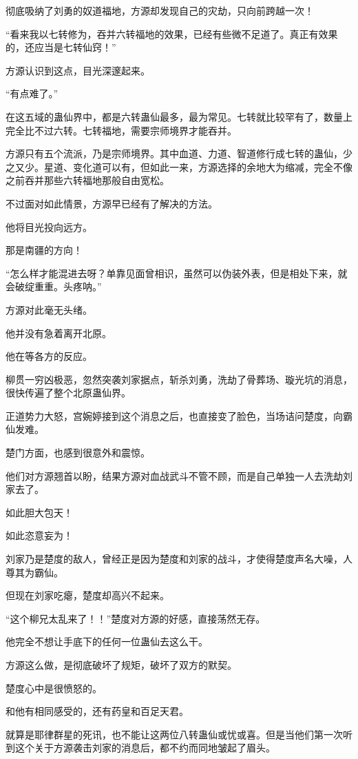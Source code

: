 \begin{this_body}
彻底吸纳了刘勇的奴道福地，方源却发现自己的灾劫，只向前跨越一次！

“看来我以七转修为，吞并六转福地的效果，已经有些微不足道了。真正有效果的，还应当是七转仙窍！”

方源认识到这点，目光深邃起来。

“有点难了。”

在这五域的蛊仙界中，都是六转蛊仙最多，最为常见。七转就比较罕有了，数量上完全比不过六转。七转福地，需要宗师境界才能吞并。

方源只有五个流派，乃是宗师境界。其中血道、力道、智道修行成七转的蛊仙，少之又少。星道、变化道可以有，但如此一来，方源选择的余地大为缩减，完全不像之前吞并那些六转福地那般自由宽松。

不过面对如此情景，方源早已经有了解决的方法。

他将目光投向远方。

那是南疆的方向！

“怎么样才能混进去呀？单靠见面曾相识，虽然可以伪装外表，但是相处下来，就会破绽重重。头疼呐。”

方源对此毫无头绪。

他并没有急着离开北原。

他在等各方的反应。

柳贯一穷凶极恶，忽然突袭刘家据点，斩杀刘勇，洗劫了骨葬场、璇光坑的消息，很快传遍了整个北原蛊仙界。

正道势力大怒，宫婉婷接到这个消息之后，也直接变了脸色，当场诘问楚度，向霸仙发难。

楚门方面，也感到很意外和震惊。

他们对方源翘首以盼，结果方源对血战武斗不管不顾，而是自己单独一人去洗劫刘家去了。

如此胆大包天！

如此恣意妄为！

刘家乃是楚度的敌人，曾经正是因为楚度和刘家的战斗，才使得楚度声名大噪，人尊其为霸仙。

但现在刘家吃瘪，楚度却高兴不起来。

“这个柳兄太乱来了！！”楚度对方源的好感，直接荡然无存。

他完全不想让手底下的任何一位蛊仙去这么干。

方源这么做，是彻底破坏了规矩，破坏了双方的默契。

楚度心中是很愤怒的。

和他有相同感受的，还有药皇和百足天君。

就算是耶律群星的死讯，也不能让这两位八转蛊仙或忧或喜。但是当他们第一次听到这个关于方源袭击刘家的消息后，都不约而同地皱起了眉头。


\end{this_body}
